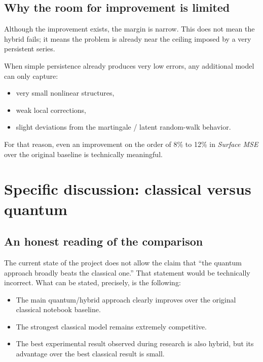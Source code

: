 \documentclass[11pt,a4paper]{article}
\begin{document}
\subsection{Why the room for improvement is limited}

Although the improvement exists, the margin is narrow. This does not mean the hybrid fails; it means the problem is already near the ceiling imposed by a very persistent series.

When simple persistence already produces very low errors, any additional model can only capture:

\begin{itemize}
    \item very small nonlinear structures,
    \item weak local corrections,
    \item slight deviations from the martingale / latent random-walk behavior.
\end{itemize}

For that reason, even an improvement on the order of 8\% to 12\% in \textit{Surface MSE} over the original baseline is technically meaningful.

\section{Specific discussion: classical versus quantum}

\subsection{An honest reading of the comparison}

The current state of the project does not allow the claim that ``the quantum approach broadly beats the classical one.'' That statement would be technically incorrect. What can be stated, precisely, is the following:

\begin{itemize}
    \item The main quantum/hybrid approach clearly improves over the original classical notebook baseline.
    \item The strongest classical model remains extremely competitive.
    \item The best experimental result observed during research is also hybrid, but its advantage over the best classical result is small.
\end{itemize}
\end{document}
